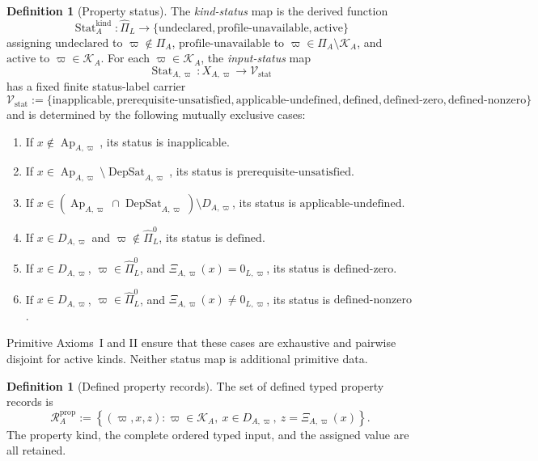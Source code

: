 \documentclass[11pt]{article}
\newcommand{\Pihat}{\widehat{\Pi}_{L}}
\newcommand{\PiZero}{\widehat{\Pi}_{L}^{0}}
\newcommand{\Ap}{\operatorname{Ap}}
\newcommand{\DepSat}{\operatorname{DepSat}}
\newcommand{\Stat}{\operatorname{Stat}}
\newcommand{\PropRec}{\mathcal R^{\mathrm{prop}}}
\theoremstyle{definition}
\newtheorem{definition}[theorem]{Definition}
\theoremstyle{remark}
\begin{document}
\begin{definition}[Property status]
\label{def:status}
The \emph{kind-status} map is the derived function
\[
\Stat_A^{\mathrm{kind}}:\Pihat\longrightarrow
\{\mathrm{undeclared},\mathrm{profile\mbox{-}unavailable},\mathrm{active}\}
\]
assigning \(\mathrm{undeclared}\) to \(\varpi\notin\Pi_A\),
\(\mathrm{profile\mbox{-}unavailable}\) to
\(\varpi\in\Pi_A\setminus\mathcal K_A\), and
\(\mathrm{active}\) to \(\varpi\in\mathcal K_A\).
For each \(\varpi\in\mathcal K_A\), the \emph{input-status} map
\[
\Stat_{A,\varpi}:X_{A,\varpi}\longrightarrow
\mathcal V_{\mathrm{stat}}
\]
has a fixed finite status-label carrier
\[
\mathcal V_{\mathrm{stat}}:=
\{\mathrm{inapplicable},
\mathrm{prerequisite\mbox{-}unsatisfied},
\mathrm{applicable\mbox{-}undefined},
\mathrm{defined},
\mathrm{defined\mbox{-}zero},
\mathrm{defined\mbox{-}nonzero}\}
\]
and is determined by the following mutually exclusive cases:
\begin{enumerate}[label=(\arabic*)]
\item If \(x\notin\Ap_{A,\varpi}\), its status is
\(\mathrm{inapplicable}\).
\item If \(x\in\Ap_{A,\varpi}\setminus\DepSat_{A,\varpi}\),
its status is \(\mathrm{prerequisite\mbox{-}unsatisfied}\).
\item If \(x\in
(\Ap_{A,\varpi}\cap\DepSat_{A,\varpi})\setminus D_{A,\varpi}\),
its status is \(\mathrm{applicable\mbox{-}undefined}\).
\item If \(x\in D_{A,\varpi}\) and
\(\varpi\notin\PiZero\), its status is \(\mathrm{defined}\).
\item If \(x\in D_{A,\varpi}\),
\(\varpi\in\PiZero\), and
\(\Xi_{A,\varpi}(x)=0_{L,\varpi}\), its status is
\(\mathrm{defined\mbox{-}zero}\).
\item If \(x\in D_{A,\varpi}\),
\(\varpi\in\PiZero\), and
\(\Xi_{A,\varpi}(x)\neq0_{L,\varpi}\), its status is
\(\mathrm{defined\mbox{-}nonzero}\).
\end{enumerate}
Primitive Axioms~I and II ensure that these cases are exhaustive
and pairwise disjoint for active kinds. Neither status map is
additional primitive data.
\end{definition}

\begin{definition}[Defined property records]
The set of defined typed property records is
\[
\PropRec_A:=
\left\{
(\varpi,x,z):
\varpi\in\mathcal K_A,
\ x\in D_{A,\varpi},
\ z=\Xi_{A,\varpi}(x)
\right\}.
\]
The property kind, the complete ordered typed input, and the assigned value are all retained.
\end{definition}
\end{document}
